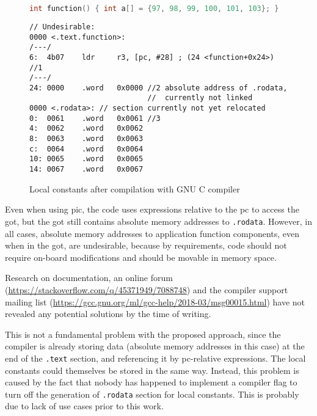 \begin{figure} [ht]
\begin{lstlisting}[language=C]
int function() { int a[] = {97, 98, 99, 100, 101, 103}; }
\end{lstlisting}
\begin{lstlisting}[style=asm]
// Undesirable:
0000 <.text.function>:
/---/
6:  4b07    ldr     r3, [pc, #28] ; (24 <function+0x24>) //1
/---/
24: 0000    .word   0x0000 //2 absolute address of .rodata,
                           //  currently not linked
0000 <.rodata>: // section currently not yet relocated
0:  0061    .word   0x0061 //3
4:  0062    .word   0x0062
8:  0063    .word   0x0063
c:  0064    .word   0x0064
10: 0065    .word   0x0065
14: 0067    .word   0x0067
\end{lstlisting}
\caption{Local constants after compilation with GNU C compiler}
\label{fig:rodata}
\end{figure}

Even when using \gls{pic}, the code uses expressions relative to the \gls{pc} to access the \gls{got}, but the \gls{got} still contains absolute memory addresses to \texttt{.rodata}. However, in all cases, absolute memory addresses to application function components, even when in the \gls{got}, are undesirable, because by requirements, code should not require on-board modifications and should be movable in memory space.

Research on documentation, an online forum (\url{https://stackoverflow.com/q/45371949/7088748}) and the compiler support mailing list (\url{https://gcc.gnu.org/ml/gcc-help/2018-03/msg00015.html}) have not revealed any potential solutions by the time of writing.

This is not a fundamental problem with the proposed approach, since the compiler is already storing data (absolute memory addresses in this case) at the end of the \texttt{.text} section, and referencing it by \gls{pc}-relative expressions. The local constants could themselves be stored in the same way. Instead, this problem is caused by the fact that nobody has happened to implement a compiler flag to turn off the generation of \texttt{.rodata} section for local constants. This is probably due to lack of use cases prior to this work.
